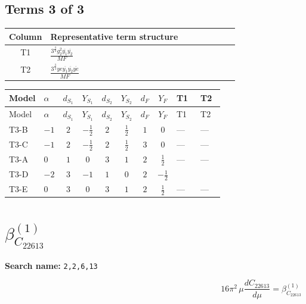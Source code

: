 \documentclass[8pt]{article}
\begin{document}
\begin{landscape}
\subsection*{Terms 3 of 3}
\begin{center}
\begin{tabular}{@{}c >{\raggedright\arraybackslash}p{0.82\linewidth}@{}}
\toprule
Column & Representative term structure \\
\midrule
T1 & \(\displaystyle \frac{3^{\frac{3}{4}} g_{2}^{2} \overline{y_{1}} \overline{y_{2}}}{MF}\) \\
\midrule
T2 & \(\displaystyle \frac{3^{\frac{3}{4}} ye \overline{y_{1}} \overline{y_{2}} \overline{ye}}{MF}\) \\
\midrule
\bottomrule
\end{tabular}
\end{center}
\smallskip
\tiny
\begin{longtable}{@{}llcccccc >{\raggedright\arraybackslash}p{0.21\linewidth} >{\raggedright\arraybackslash}p{0.21\linewidth}@{}}
\toprule
Model & $\alpha$ & $d_{S_1}$ & $Y_{S_1}$ & $d_{S_2}$ & $Y_{S_2}$ & $d_F$ & $Y_F$ & T1 & T2 \\
\midrule
\endfirsthead
\toprule
Model & $\alpha$ & $d_{S_1}$ & $Y_{S_1}$ & $d_{S_2}$ & $Y_{S_2}$ & $d_F$ & $Y_F$ & T1 & T2 \\
\midrule
\endhead
T3-B & $-1$ & $2$ & $-\frac{1}{2}$ & $2$ & $\frac{1}{2}$ & $1$ & $0$ & --- & --- \\
\midrule
T3-C & $-1$ & $2$ & $-\frac{1}{2}$ & $2$ & $\frac{1}{2}$ & $3$ & $0$ & --- & --- \\
\midrule
T3-A & $0$ & $1$ & $0$ & $3$ & $1$ & $2$ & $\frac{1}{2}$ & --- & --- \\
\midrule
T3-D & $-2$ & $3$ & $-1$ & $1$ & $0$ & $2$ & $-\frac{1}{2}$ & \scriptsize\adjustbox{max width=\linewidth}{$\begin{gathered} \frac{11 \cdot 3^{\frac{3}{4}} g_{2}^{2} \overline{y_{1}} \overline{y_{2}}}{8 MF}\end{gathered}$} & \scriptsize\adjustbox{max width=\linewidth}{$\begin{gathered} - \frac{3^{\frac{3}{4}} ye \overline{y_{1}} \overline{y_{2}} \overline{ye}}{12 MF}\end{gathered}$} \\
\midrule
T3-E & $0$ & $3$ & $0$ & $3$ & $1$ & $2$ & $\frac{1}{2}$ & --- & --- \\
\midrule
\bottomrule
\end{longtable}
\clearpage
\section*{$\beta_{C_{22613}}^{(1)}$}
\noindent\textbf{Search name: }\texttt{2,2,6,13}\par\smallskip
\[16\pi^2\,\mu\frac{d C_{22613}}{d\mu}=\beta_{C_{22613}}^{(1)}\]

\end{landscape}
\end{document}
